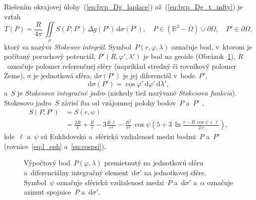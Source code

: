 \documentclass[a4paper, 12pt]{book}
\newcommand{\diff}{\mathrm d}
\begin{document}
Riešením okrajovej úlohy~(\ref{eq:bvp_Dg_laplace}) až~(\ref{eq:bvp_Dg_t_infty}) 
je vzťah
%
\begin{equation}
\label{eq:stokes}
T(P) = \frac{R}{4\pi} \, \iint\limits_{\sigma} S(P, P') \, \Delta g(P') \, 
\diff \sigma(P'){,} \quad P \in \left( \mathbb{R}^3 - \overline\Omega \right) 
\cup \partial\Omega{,} \quad P' \in \partial\Omega{,}
\end{equation}
%
ktorý sa nazýva \emph{Stokesov integrál}.  Symbol~$P(r, \varphi, \lambda)$ 
označuje bod, v~ktorom je počítaný poruchový potenciál, $P'(R, \varphi', 
\lambda')$ je bod na geoide (Obrázok~\ref{fig:surface_integral}), $R$~označuje 
polomer referenčnej sféry (napríklad stredný či rovníkový polomer Zeme), 
$\sigma$ je jednotková sféra, $\diff\sigma(P')$ je jej diferenciál v~bode~$P'$,
%
\begin{equation}
\label{eq:diff_sigma}
\diff\sigma(P') = \cos\varphi' \, \diff\varphi' \, \diff\lambda'{,}
\end{equation}
%
a~$S$ je \emph{Stokesovo integračné jadro} (niekedy tiež nazývané 
\emph{Stokesova funkcia}).  Stokesovo jadro~$S$ závisí iba od vzájomnej polohy 
bodov~$P$ a~$P'$ \parencite{MoritzPhysicalGeodesy},
%
\begin{equation}
\label{eq:stokes_kernel_general}
\begin{split}
S(P, P') &= S(r, \psi)\\
%
&= \frac{2R}{\ell} + \frac{R}{r} - 3\frac{R \, \ell}{r^2} - \frac{R^2}{r^2} \, 
\cos\psi\left( 5 + 3 \, \ln \frac{r - R \, \cos\psi + \ell}{2 \, r} \right){,}
\end{split}
\end{equation}
%
kde~$\ell$ a~$\psi$ sú Euklidovská a~sférická vzdialenosť medzi bodmi~$P$ 
a~$P'$ (rovnice~\ref{eq:l_sph} a~\ref{eq:cospsi}).

\begin{figure}[bt]
\centering

\caption{Výpočtový bod~$P(\varphi, \lambda)$ premietnutý na jednotkovú sféru 
a~diferenciálny integračný element~$\diff\sigma'$ na jednotkovej sfére.  
Symbol~$\psi$ označuje sférickú vzdialenosť medzi~$P$ a~$\diff\sigma'$ 
a~$\alpha$ označuje azimut spojnice~$P$ a~$\diff\sigma'$.}
\label{fig:surface_integral}
\end{figure}
\end{document}
